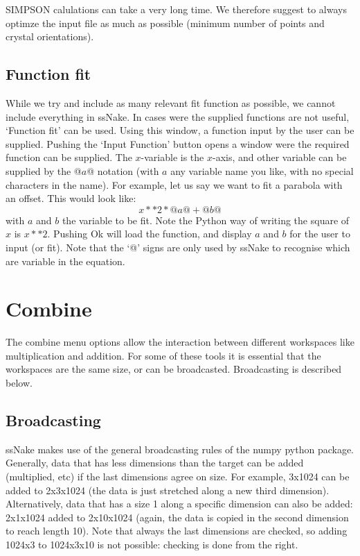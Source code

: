 \documentclass[11pt,a4paper]{article}
\begin{document}
SIMPSON calulations can take a very long time. We therefore suggest to always optimze the input file
as much as possible (minimum number of points and crystal orientations).




\subsection{Function fit}
While we try and include as  many relevant fit function as possible, we cannot include everything in
ssNake. In cases were the supplied functions are not useful, `Function fit' can be used. Using this
window, a function input by the user can be supplied. Pushing the `Input Function' button opens a
window were the required function can be supplied. The $x$-variable is the $x$-axis, and other
variable can be supplied by the @$a$@ notation (with $a$ any variable name you like, with no special
characters in the name). For example, let us say we want to fit a parabola with an offset. This would look like:
\begin{equation}
  x ** 2 * @a@ + @b@
\end{equation}
with $a$ and $b$ the variable to be fit. Note the Python way of writing the square of $x$ is $x **
2$. Pushing Ok will load the function, and display $a$ and $b$ for the user to input (or fit). Note
that the `@' signs are only used by ssNake to recognise which are variable in the equation.


\section{Combine}
The combine menu options allow the interaction between different workspaces like multiplication and addition. For some of these tools it is essential that the workspaces
are the same size, or can be broadcasted. Broadcasting is described below.

\subsection{Broadcasting}
ssNake makes use of the general broadcasting rules of the numpy python package. Generally, data that has less dimensions than the target can be added (multiplied, etc)
if the last dimensions agree on size. For example, 3x1024 can be added to 2x3x1024 (the data is just stretched along a new third dimension). Alternatively, data that has a size 1
along a specific dimension can also be added: 2x1x1024 added to 2x10x1024 (again, the data is copied in the second dimension to reach length 10).
Note that always the last dimensions are checked, so adding 1024x3 to 1024x3x10 is not possible: checking is done from the right.
\end{document}
